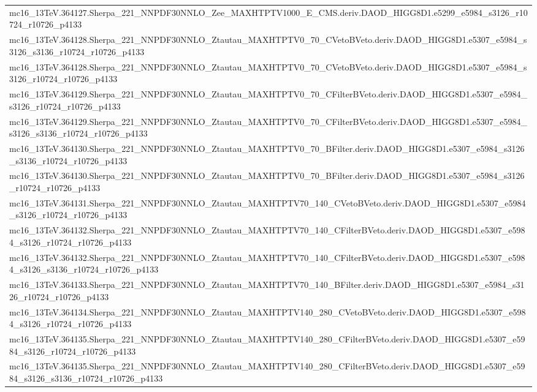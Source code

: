 \begin{adjustwidth}{-3em}{-3em}
\begin{longtable}{l}
mc16\_13TeV.364127.Sherpa\_221\_NNPDF30NNLO\_Zee\_MAXHTPTV1000\_E\_CMS.deriv.DAOD\_HIGG8D1.e5299\_e5984\_s3126\_r10724\_r10726\_p4133 \\
mc16\_13TeV.364128.Sherpa\_221\_NNPDF30NNLO\_Ztautau\_MAXHTPTV0\_70\_CVetoBVeto.deriv.DAOD\_HIGG8D1.e5307\_e5984\_s3126\_s3136\_r10724\_r10726\_p4133 \\
mc16\_13TeV.364128.Sherpa\_221\_NNPDF30NNLO\_Ztautau\_MAXHTPTV0\_70\_CVetoBVeto.deriv.DAOD\_HIGG8D1.e5307\_e5984\_s3126\_r10724\_r10726\_p4133 \\
mc16\_13TeV.364129.Sherpa\_221\_NNPDF30NNLO\_Ztautau\_MAXHTPTV0\_70\_CFilterBVeto.deriv.DAOD\_HIGG8D1.e5307\_e5984\_s3126\_r10724\_r10726\_p4133 \\
mc16\_13TeV.364129.Sherpa\_221\_NNPDF30NNLO\_Ztautau\_MAXHTPTV0\_70\_CFilterBVeto.deriv.DAOD\_HIGG8D1.e5307\_e5984\_s3126\_s3136\_r10724\_r10726\_p4133 \\
mc16\_13TeV.364130.Sherpa\_221\_NNPDF30NNLO\_Ztautau\_MAXHTPTV0\_70\_BFilter.deriv.DAOD\_HIGG8D1.e5307\_e5984\_s3126\_s3136\_r10724\_r10726\_p4133 \\
mc16\_13TeV.364130.Sherpa\_221\_NNPDF30NNLO\_Ztautau\_MAXHTPTV0\_70\_BFilter.deriv.DAOD\_HIGG8D1.e5307\_e5984\_s3126\_r10724\_r10726\_p4133 \\
mc16\_13TeV.364131.Sherpa\_221\_NNPDF30NNLO\_Ztautau\_MAXHTPTV70\_140\_CVetoBVeto.deriv.DAOD\_HIGG8D1.e5307\_e5984\_s3126\_r10724\_r10726\_p4133 \\
mc16\_13TeV.364132.Sherpa\_221\_NNPDF30NNLO\_Ztautau\_MAXHTPTV70\_140\_CFilterBVeto.deriv.DAOD\_HIGG8D1.e5307\_e5984\_s3126\_r10724\_r10726\_p4133 \\
mc16\_13TeV.364132.Sherpa\_221\_NNPDF30NNLO\_Ztautau\_MAXHTPTV70\_140\_CFilterBVeto.deriv.DAOD\_HIGG8D1.e5307\_e5984\_s3126\_s3136\_r10724\_r10726\_p4133 \\
mc16\_13TeV.364133.Sherpa\_221\_NNPDF30NNLO\_Ztautau\_MAXHTPTV70\_140\_BFilter.deriv.DAOD\_HIGG8D1.e5307\_e5984\_s3126\_r10724\_r10726\_p4133 \\
mc16\_13TeV.364134.Sherpa\_221\_NNPDF30NNLO\_Ztautau\_MAXHTPTV140\_280\_CVetoBVeto.deriv.DAOD\_HIGG8D1.e5307\_e5984\_s3126\_r10724\_r10726\_p4133 \\
mc16\_13TeV.364135.Sherpa\_221\_NNPDF30NNLO\_Ztautau\_MAXHTPTV140\_280\_CFilterBVeto.deriv.DAOD\_HIGG8D1.e5307\_e5984\_s3126\_r10724\_r10726\_p4133 \\
mc16\_13TeV.364135.Sherpa\_221\_NNPDF30NNLO\_Ztautau\_MAXHTPTV140\_280\_CFilterBVeto.deriv.DAOD\_HIGG8D1.e5307\_e5984\_s3126\_s3136\_r10724\_r10726\_p4133 \\

\end{longtable}
\end{adjustwidth}
